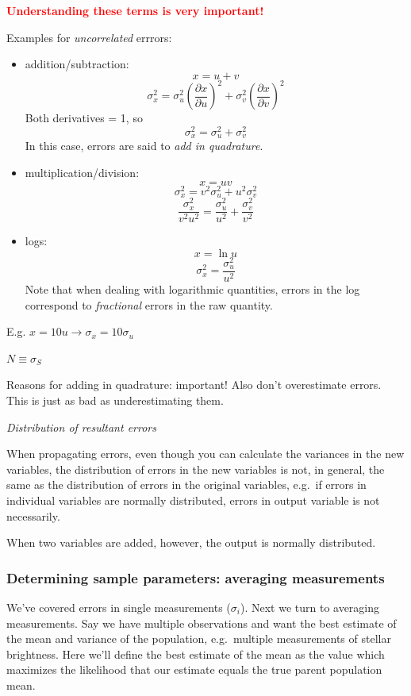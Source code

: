 \documentclass[12pt]{article}
\begin{document}
\textcolor{red}{\textbf{Understanding these terms is very important!}}

Examples for \emph{uncorrelated} errrors:
\begin{itemize}
    \item addition/subtraction:
        $$ x = u + v $$
        $$ \sigma_x^{2} = \sigma_u^{2}\left(\frac{\partial x}
        {\partial u}\right)^{2}
        + \sigma_v^{2}\left(\frac{\partial x}{\partial v}\right)^{2} $$
        Both derivatives = 1, so
        $$ \sigma_x^{2} = \sigma_u^{2} + \sigma_v^{2} $$
        In this case, errors are said to \emph{add in quadrature}.
    \item multiplication/division:
        $$ x = uv $$
        $$ \sigma_x^{2} = v^{2}\sigma_u^{2} + u^{2}\sigma_v^{2} $$
        $$ \frac{\sigma_x^{2}}{v^{2}u^{2}} =
        \frac{\sigma_u^{2}}{u^{2}} + \frac{\sigma_v^{2}}{v^{2}}$$
    \item logs:
        $$ x = \ln u $$
        $$ \sigma_x^{2} = \frac{\sigma_u^{2}}{u^{2}} $$
        Note that when dealing with logarithmic quantities, errors in
        the log correspond to \emph{fractional} errors in the raw
        quantity.
\end{itemize}

\textcolor{myBlue}{E.g. $x=10u \rightarrow \sigma_x=10\sigma_u$}

\textcolor{myBlue}{$N \equiv \sigma_S$}

\textcolor{myBlue}{Reasons for adding in quadrature: important!
Also don't overestimate errors. This is just as bad as
underestimating them.}

\emph{Distribution of resultant errors}

When propagating errors, even though you can calculate the variances
in the new variables, the distribution of errors in the new variables
is not, in general, the same as the distribution of errors in the
original variables, e.g.\ if errors in individual variables are
normally distributed, errors in output variable is not necessarily.

When two variables are added, however, the output is normally
distributed.


\textcolor{om}{\emph{}}


\subsubsection{Determining sample parameters: averaging measurements}
We've covered errors in single measurements ($\sigma_i$).
Next we turn to averaging measurements.
Say we have multiple observations and want the best
estimate of the mean and variance of the population, e.g.\ multiple
measurements of stellar brightness. Here we'll define the best
estimate of the mean as the value which maximizes the likelihood that
our estimate equals the true parent population mean.
\end{document}
